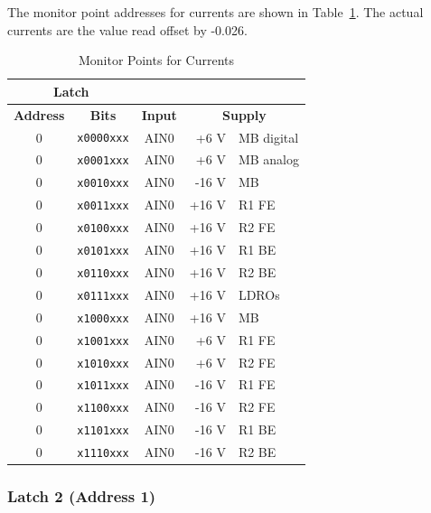 \documentclass[letterpaper,11pt]{book}
\begin{document}
The monitor point addresses for currents are shown in 
Table~\ref{tab:I-mon-points}.
The actual currents are the value read offset by -0.026.
\begin{table}[h!tb]
  \begin{center}
    \caption{\label{tab:I-mon-points}Monitor Points for Currents}
    \begin{tabular}{|c|c|c|rl|}
    \hline
\multicolumn{2}{|c|}{\bf Latch} & \multicolumn{3}{c|}{ } \\ 
\hline  
{\bf Address} & {\bf Bits} & {\bf Input} & \multicolumn{2}{c}{\bf Supply }  \\
\hline
0 & {\tt x0000xxx} & AIN0 & +6 V  & MB digital  \\
0 & {\tt x0001xxx} & AIN0 & +6 V  & MB analog   \\
0 & {\tt x0010xxx} & AIN0 & -16 V & MB          \\
0 & {\tt x0011xxx} & AIN0 & +16 V & R1 FE  \\
0 & {\tt x0100xxx} & AIN0 & +16 V & R2 FE  \\
0 & {\tt x0101xxx} & AIN0 & +16 V & R1 BE  \\
0 & {\tt x0110xxx} & AIN0 & +16 V & R2 BE  \\
0 & {\tt x0111xxx} & AIN0 & +16 V & LDROs  \\
0 & {\tt x1000xxx} & AIN0 & +16 V & MB     \\
0 & {\tt x1001xxx} & AIN0 &  +6 V & R1 FE  \\
0 & {\tt x1010xxx} & AIN0 &  +6 V & R2 FE  \\
0 & {\tt x1011xxx} & AIN0 & -16 V & R1 FE  \\
0 & {\tt x1100xxx} & AIN0 & -16 V & R2 FE \\
0 & {\tt x1101xxx} & AIN0 & -16 V & R1 BE  \\
0 & {\tt x1110xxx} & AIN0 & -16 V & R2 BE  \\
\hline
    \end{tabular}
  \end{center}
\end{table}


\subsubsection{Latch 2 (Address 1)}
\end{document}
